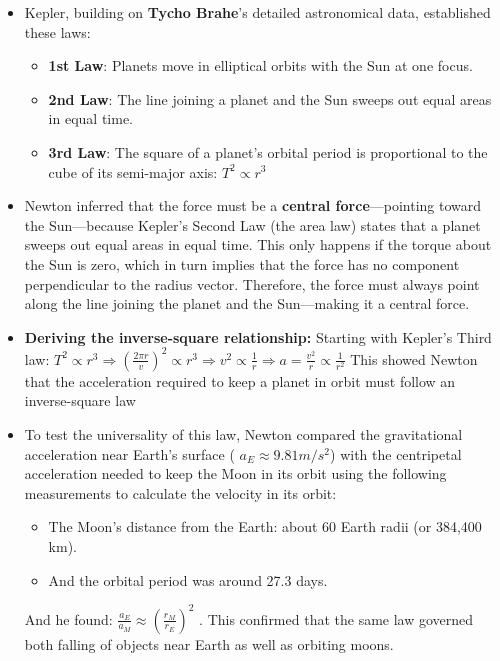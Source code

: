 \documentclass[
  letterpaper,
  DIV=11,
  numbers=noendperiod]{scrreprt}
\providecommand{\tightlist}{%
  \setlength{\itemsep}{0pt}\setlength{\parskip}{0pt}}
\begin{document}
\begin{itemize}
\item
  Kepler, building on \textbf{Tycho Brahe}'s detailed astronomical data,
  established these laws:

  \begin{itemize}
  \item
    \textbf{1st Law}: Planets move in elliptical orbits with the Sun at
    one focus.
  \item
    \textbf{2nd Law}: The line joining a planet and the Sun sweeps out
    equal areas in equal time.
  \item
    \textbf{3rd Law}: The square of a planet's orbital period is
    proportional to the cube of its semi-major axis: \(T^2\propto r^3\)
  \end{itemize}
\item
  Newton inferred that the force must be a \textbf{central
  force}---pointing toward the Sun---because Kepler's Second Law (the
  area law) states that a planet sweeps out equal areas in equal time.
  This only happens if the torque about the Sun is zero, which in turn
  implies that the force has no component perpendicular to the radius
  vector. Therefore, the force must always point along the line joining
  the planet and the Sun---making it a central force.
\item
  \textbf{Deriving the inverse-square relationship:} Starting with
  Kepler's Third law:
  \(T^2 \propto r^3 \Rightarrow \left(\frac{2\pi r}{v}\right)^2 \propto r^3 \Rightarrow v^2 \propto \frac{1}{r} \Rightarrow a= \frac{v^2}{r} \propto \frac{1}{r^2}\)
  This showed Newton that the acceleration required to keep a planet in
  orbit must follow an inverse-square law
\item
  To test the universality of this law, Newton compared the
  gravitational acceleration near Earth's surface (
  \(a_E\approx 9.81 m/s^2\)) with the centripetal acceleration needed to
  keep the Moon in its orbit using the following measurements to
  calculate the velocity in its orbit:

  \begin{itemize}
  \tightlist
  \item
    The Moon's distance from the Earth: about 60 Earth radii (or 384,400
    km).
  \item
    And the orbital period was around 27.3 days.
  \end{itemize}

  And he found:
  \(\frac{a_E}{a_M}\approx \left(\frac{r_M}{r_E} \right)^2\) . This
  confirmed that the same law governed both falling of objects near
  Earth as well as orbiting moons.
\end{itemize}
\end{document}
